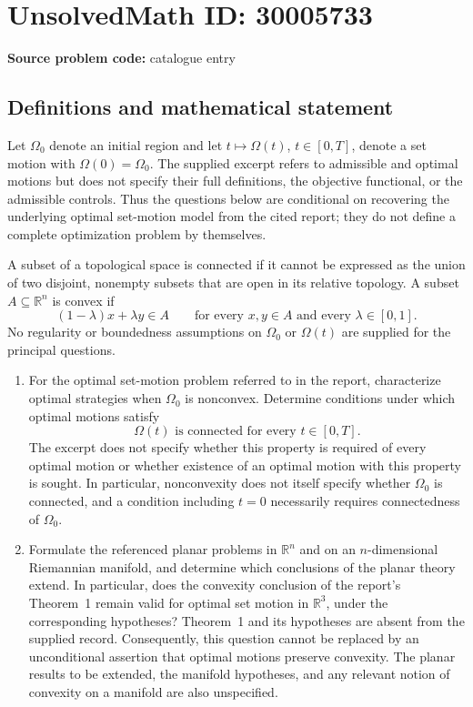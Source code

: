\documentclass[11pt]{article}
\newcommand{\R}{\mathbb{R}}
\begin{document}
\section*{UnsolvedMath ID: 30005733}
\textbf{Source problem code:} catalogue entry
\subsection{Definitions and mathematical statement}
Let \(\Omega_0\) denote an initial region and let \(t\mapsto\Omega(t)\), \(t\in[0,T]\), denote a set motion with \(\Omega(0)=\Omega_0\). The supplied excerpt refers to admissible and optimal motions but does not specify their full definitions, the objective functional, or the admissible controls. Thus the questions below are conditional on recovering the underlying optimal set-motion model from the cited report; they do not define a complete optimization problem by themselves.

A subset of a topological space is connected if it cannot be expressed as the union of two disjoint, nonempty subsets that are open in its relative topology. A subset \(A\subseteq\R^n\) is convex if
\[
(1-\lambda)x+\lambda y\in A
\qquad\text{for every }x,y\in A\text{ and every }\lambda\in[0,1].
\]
No regularity or boundedness assumptions on \(\Omega_0\) or \(\Omega(t)\) are supplied for the principal questions.

\begin{enumerate}
\item[(Q2)] For the optimal set-motion problem referred to in the report, characterize optimal strategies when \(\Omega_0\) is nonconvex. Determine conditions under which optimal motions satisfy
\[
\Omega(t)\text{ is connected for every }t\in[0,T].
\]
The excerpt does not specify whether this property is required of every optimal motion or whether existence of an optimal motion with this property is sought. In particular, nonconvexity does not itself specify whether \(\Omega_0\) is connected, and a condition including \(t=0\) necessarily requires connectedness of \(\Omega_0\).
\item[(Q3)] Formulate the referenced planar problems in \(\R^n\) and on an \(n\)-dimensional Riemannian manifold, and determine which conclusions of the planar theory extend. In particular, does the convexity conclusion of the report's Theorem~1 remain valid for optimal set motion in \(\R^3\), under the corresponding hypotheses? Theorem~1 and its hypotheses are absent from the supplied record. Consequently, this question cannot be replaced by an unconditional assertion that optimal motions preserve convexity. The planar results to be extended, the manifold hypotheses, and any relevant notion of convexity on a manifold are also unspecified.
\end{enumerate}
\end{document}
